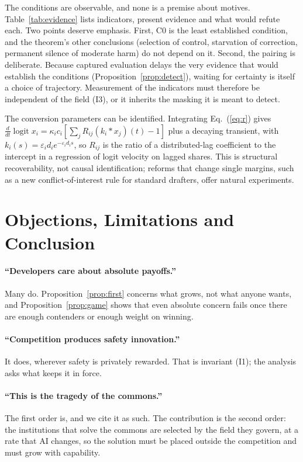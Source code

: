 \documentclass[letterpaper]{article} %
\theoremstyle{definition}
\begin{document}
The conditions are observable, and none is a premise about motives. Table~\ref{tab:evidence} lists indicators, present evidence and what would refute each. Two points deserve emphasis. First, C0 is the least established condition, and the theorem's other conclusions (selection of control, starvation of correction, permanent silence of moderate harm) do not depend on it. Second, the pairing is deliberate. Because captured evaluation delays the very evidence that would establish the conditions (Proposition~\ref{prop:detect}), waiting for certainty is itself a choice of trajectory. Measurement of the indicators must therefore be independent of the field (I3), or it inherits the masking it is meant to detect.

The conversion parameters can be identified. Integrating Eq.~(\ref{eq:r}) gives $\tfrac{d}{dt}\operatorname{logit}x_i=\kappa_ic_i[\sum_jR_{ij}(k_i*x_j)(t)-1]$ plus a decaying transient, with $k_i(s)=\varepsilon_id_ie^{-\varepsilon_id_is}$, so $R_{ij}$ is the ratio of a distributed-lag coefficient to the intercept in a regression of logit velocity on lagged shares. This is structural recoverability, not causal identification; reforms that change single margins, such as a new conflict-of-interest rule for standard drafters, offer natural experiments.

\section{Objections, Limitations and Conclusion}\label{sec:conclusion}

\paragraph{``Developers care about absolute payoffs.''} Many do. Proposition~\ref{prop:first} concerns what grows, not what anyone wants, and Proposition~\ref{prop:game} shows that even absolute concern fails once there are enough contenders or enough weight on winning.

\paragraph{``Competition produces safety innovation.''} It does, wherever safety is privately rewarded. That is invariant (I1); the analysis asks what keeps it in force.

\paragraph{``This is the tragedy of the commons.''} The first order is, and we cite it as such. The contribution is the second order: the institutions that solve the commons are selected by the field they govern, at a rate that AI changes, so the solution must be placed outside the competition and must grow with capability.
\end{document}
